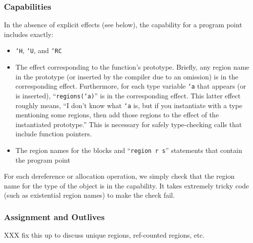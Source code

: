 \subsubsection{Capabilities}

In the absence of explicit effects (see below), the capability for a
program point includes exactly:
\begin{itemize}
\item \texttt{`H}, \texttt{`U}, and \texttt{`RC}
\item The effect corresponding to the function's prototype.  Briefly,
any region name in the prototype (or inserted by the compiler due to
an omission) is in the corresponding effect.  Furthermore, for each
type variable \texttt{`a} that appears (or is inserted),
``\texttt{regions(`a)}'' is in the corresponding effect.  This latter
effect roughly means, ``I don't know what \texttt{`a} is, but if you
instantiate with a type mentioning some regions, then add those
regions to the effect of the instantiated prototype.''  This is
necessary for safely type-checking calls that include function pointers.
\item The region names for the blocks and ``\texttt{region r s}''
  statements that contain the program point
\end{itemize}

For each dereference or allocation operation, we simply check that the
region name for the type of the object is in the capability.  It takes
extremely tricky code (such as existential region names) to make the
check fail.

\subsubsection{Assignment and Outlives}

XXX fix this up to discuss unique regions, ref-counted regions, etc.

